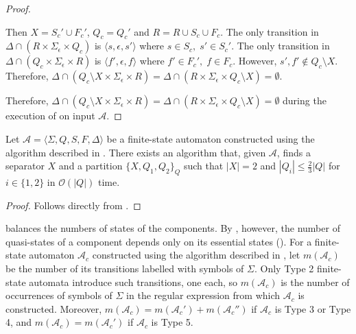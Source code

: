 \begin{proof}
  \begin{case}
    Then $X = S_c' \cup F_c'$, $Q_c = Q_c'$ and $R = R \cup S_c \cup
      F_c$. The only transition in $\Delta \cap (R \times \Sigma_\epsilon
      \times Q_c)$ is $\langle s, \epsilon, s' \rangle$ where $s \in S_c,
      \; s' \in S_c'$. The only transition in $\Delta \cap (Q_c \times
      \Sigma_\epsilon \times R)$ is $\langle f', \epsilon, f \rangle$
    where $f' \in F_c', \; f \in F_c$. However, $s', f' \not\in Q_c
      \setminus X$. Therefore, $\Delta \cap (Q_c \setminus X \times
      \Sigma_\epsilon \times R) = \Delta \cap (R \times \Sigma_\epsilon
      \times Q_c \setminus X) = \emptyset$.
  \end{case}

  \noindent
  Therefore, $\Delta \cap (Q_c \setminus X \times \Sigma_\epsilon \times R) =
    \Delta \cap (R \times \Sigma_\epsilon \times Q_c \setminus X) = \emptyset$
  during the execution of  on input
  $\mathcal{A}$.
\end{proof}

\begin{theorem}\label{thm:thompson_separator}
  Let $\mathcal{A} = \langle \Sigma, Q, S, F, \Delta \rangle$ be a finite-state
  automaton constructed using the algorithm described in .
  There exists an algorithm that, given $\mathcal{A}$, finds a separator $X$ and a
  partition $\{ X, Q_1, Q_2 \}_Q$ such that $|X| = 2$ and $|Q_i| \leq \frac{2}{3}
  |Q|$ for $i \in \{ 1, 2 \}$ in $\mathcal{O}(|Q|)$ time.
\end{theorem}

\begin{proof}
  Follows directly from .
\end{proof}

 balances the numbers of states of the components. By
, however, the number of quasi-states of a component
depends only on its essential states (). For a finite-state
automaton $\mathcal{A}_c$ constructed using the algorithm described in
, let $m(\mathcal{A}_c)$ be the number of its transitions labelled
with symbols of $\Sigma$. Only Type 2 finite-state automata introduce such transitions,
one each, so $m(\mathcal{A}_c)$ is the number of occurrences of symbols of $\Sigma$ in
the regular expression from which $\mathcal{A}_c$ is constructed. Moreover,
$m(\mathcal{A}_c) = m(\mathcal{A}_c') + m(\mathcal{A}_c'')$ if $\mathcal{A}_c$ is Type 3
or Type 4, and $m(\mathcal{A}_c) = m(\mathcal{A}_c')$ if $\mathcal{A}_c$ is Type 5.

